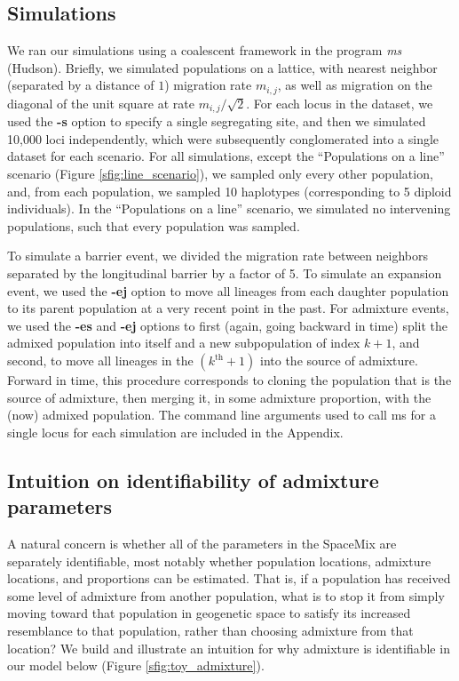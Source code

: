 \documentclass[12pt]{article}
\begin{document}
\subsection*{Simulations}
We ran our simulations using a coalescent framework in the program \textit{ms} (Hudson).  Briefly, we simulated populations on a lattice, with nearest neighbor (separated by a distance of $1$) migration rate $m_{i,j}$, as well as migration on the diagonal of the unit square at rate $m_{i,j}/\sqrt{2}$.  For each locus in the dataset, we used the \textbf{-s} option to specify a single segregating site, and then we simulated 10,000 loci independently, which were subsequently conglomerated into a single dataset for each scenario.  For all simulations, except the ``Populations on a line'' scenario (Figure \ref{sfig:line_scenario}), we sampled only every other population, and, from each population, we sampled 10 haplotypes (corresponding to 5 diploid individuals).  In the ``Populations on a line'' scenario, we simulated no intervening populations, such that every population was sampled.

To simulate a barrier event, we divided the migration rate between neighbors separated by the longitudinal barrier by a factor of 5.  To simulate an expansion event, we used the \textbf{-ej} option to move all lineages from each daughter population to its parent population at a very recent point in the past.  For admixture events, we used the \textbf{-es} and \textbf{-ej} options to first (again, going backward in time) split the admixed population into itself and a new subpopulation of index $k + 1$, and second, to move all lineages in the $(k^{\text{th}} + 1)$ into the source of admixture.  Forward in time, this procedure corresponds to cloning the population that is the source of admixture, then merging it, in some admixture proportion, with the (now) admixed population.  The command line arguments used to call ms for a single locus for each simulation are included in the Appendix.

\subsection*{Intuition on identifiability of admixture parameters}
A natural concern is whether all of the parameters in the SpaceMix are separately identifiable, most notably whether population locations, admixture locations, and proportions can be estimated. That is, if a population has received some level of admixture from another population, what is to stop it from simply moving toward that population in geogenetic space to satisfy its increased resemblance to that population, rather than choosing admixture from that location?  We build and illustrate an intuition for why admixture is identifiable in our model below (Figure \ref{sfig:toy_admixture}).
\end{document}
